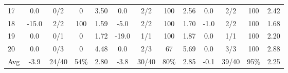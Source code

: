 \begin{table}[p]
{\begin{tabular}{l|cccc|cccc|cccc}
17 & 0.0 & 0/2 & 0 & 3.50 & 0.0 & 2/2 & 100 & 2.56 & 0.0 & 2/2 & 100 & 2.42 \\
18 & -15.0 & 2/2 & 100 & 1.59 & -5.0 & 2/2 & 100 & 1.70 & -1.0 & 2/2 & 100 & 1.68 \\
19 & 0.0 & 0/1 & 0 & 1.72 & -19.0 & 1/1 & 100 & 1.87 & 0.0 & 1/1 & 100 & 2.20 \\
20 & 0.0 & 0/3 & 0 & 4.48 & 0.0 & 2/3 & 67 & 5.69 & 0.0 & 3/3 & 100 & 2.88 \\
\midrule
Avg & -3.9 & 24/40 & 54\% & 2.80 & -3.8 & 30/40 & 80\% & 2.85 & -0.1 & 39/40 & 95\% & 2.25 \\
\bottomrule
\end{tabular}%
}
\end{table}
